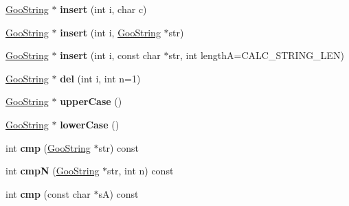 \begin{DoxyCompactItemize}
\item 
\mbox{\label{class_goo_string_a5d760ca7b4f7b9494e1222cc43414faf}} 
\hyperlink{class_goo_string}{Goo\+String} $\ast$ {\bfseries insert} (int i, char c)
\item 
\mbox{\label{class_goo_string_a95890969e7143af2235913c65256ea13}} 
\hyperlink{class_goo_string}{Goo\+String} $\ast$ {\bfseries insert} (int i, \hyperlink{class_goo_string}{Goo\+String} $\ast$str)
\item 
\mbox{\label{class_goo_string_a02f3213fbe7fa984e4172ac9949604dc}} 
\hyperlink{class_goo_string}{Goo\+String} $\ast$ {\bfseries insert} (int i, const char $\ast$str, int lengthA=C\+A\+L\+C\+\_\+\+S\+T\+R\+I\+N\+G\+\_\+\+L\+EN)
\item 
\mbox{\label{class_goo_string_a3f44cde059f10e21acabb41790ed09d4}} 
\hyperlink{class_goo_string}{Goo\+String} $\ast$ {\bfseries del} (int i, int n=1)
\item 
\mbox{\label{class_goo_string_a4e39000e8d8703dd2d329377ae984e49}} 
\hyperlink{class_goo_string}{Goo\+String} $\ast$ {\bfseries upper\+Case} ()
\item 
\mbox{\label{class_goo_string_aec401c228fd4164384b2ef07974f98f0}} 
\hyperlink{class_goo_string}{Goo\+String} $\ast$ {\bfseries lower\+Case} ()
\item 
\mbox{\label{class_goo_string_a2f743f16b29715d6617f75061bfe4fd8}} 
int {\bfseries cmp} (\hyperlink{class_goo_string}{Goo\+String} $\ast$str) const
\item 
\mbox{\label{class_goo_string_a80cf9ebba928223b6d8a83e2354d99b1}} 
int {\bfseries cmpN} (\hyperlink{class_goo_string}{Goo\+String} $\ast$str, int n) const
\item 
\mbox{\label{class_goo_string_ab49e1ae2c7908fa3faf5bd5f73dee37c}} 
int {\bfseries cmp} (const char $\ast$sA) const
\item 
\mbox{\label{class_goo_string_a7d88087ee88b7ab624c7307a9872e961}} 

\end{DoxyCompactItemize}
